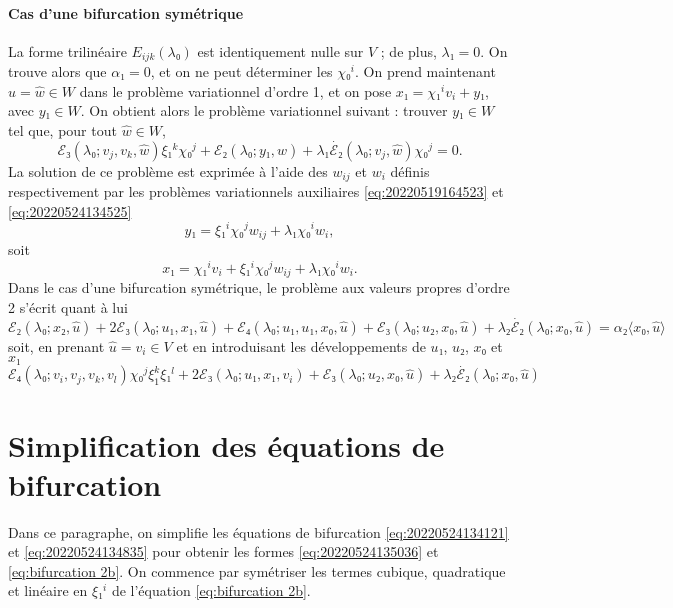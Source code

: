 \documentclass[12pt, final]{amsart}
\theoremstyle{definition}
\begin{document}
\paragraph{Cas d'une bifurcation symétrique}La forme trilinéaire \(E_{i j k}(λ₀)\) est identiquement nulle sur \(V\) ; de plus, \(λ₁ = 0\). On trouve alors que \(α₁ = 0\), et on ne peut déterminer les \(χ₀^i\). On prend maintenant \(\hat{u} = \hat{w}∈W\) dans le problème variationnel d'ordre 1, et on pose \(x₁ = χ₁^i v_i + y₁\), avec \(y₁∈W\). On obtient alors le problème variationnel suivant : trouver \(y₁∈W\) tel que, pour tout \(\hat{w}∈W\),
\begin{equation} ℰ₃(λ₀ ; v_j, v_k, \hat{w}) ξ₁^k χ₀^j
  +ℰ₂(λ₀ ; y₁, \hat{w}) + λ₁ \dot{ℰ₂}
 (λ₀ ; v_j, \hat{w}) χ₀^j = 0. \end{equation}
La solution de ce problème est exprimée à l'aide des \(w_{i j}\) et \(w_i\) définis respectivement par les problèmes variationnels auxiliaires \eqref{eq:20220519164523} et \eqref{eq:20220524134525}
\begin{equation} y₁ = ξ₁^i χ₀^j w_{i j} + λ₁ χ₀^i w_i, \end{equation}
soit
\begin{equation} x₁ = χ₁^i v_i + ξ₁^i χ₀^j w_{i j} + λ₁ χ₀^i
  w_i . \end{equation}
Dans le cas d'une bifurcation symétrique, le problème aux valeurs propres d'ordre 2 s'écrit quant à lui
\begin{equation} ℰ₂(λ₀ ; x₂, \hat{u}) + 2ℰ₃(λ₀ ; u₁,
  x₁, \hat{u}) +ℰ₄ (λ₀ ; u₁, u₁, x₀, \hat{u})
  +ℰ₃(λ₀ ; u₂, x₀, \hat{u}) + λ₂
  \dot{ℰ₂}(λ₀ ; x₀, \hat{u}) = α₂ 〈 x₀,
  \hat{u} 〉 \end{equation}
soit, en prenant \(\hat{u} = \widehat{v_i}∈V\) et en introduisant les développements de \(u₁\), \(u₂\), \(x₀ \) et \(x₁\)
\begin{equation} ℰ₄ (λ₀ ; v_i, v_j, v_k, v_l) χ₀^j ξ_{1 }^k ξ₁^l
  + 2ℰ₃(λ₀ ; u₁, x₁, v_i) +ℰ₃(λ₀ ;
  u₂, x₀, \hat{u}) + λ₂ \dot{ℰ₂}(λ₀ ; x₀,
  \hat{u}) \end{equation}
\section{Simplification des équations de
bifurcation}\label{sec:20220524134954}

Dans ce paragraphe, on simplifie les équations de bifurcation \eqref{eq:20220524134121} et \eqref{eq:20220524134835} pour obtenir les formes \eqref{eq:20220524135036} et \eqref{eq:bifurcation 2b}. On commence par symétriser les termes cubique, quadratique et linéaire en \(ξ₁^i\) de
l'équation \eqref{eq:bifurcation 2b}.
\end{document}

